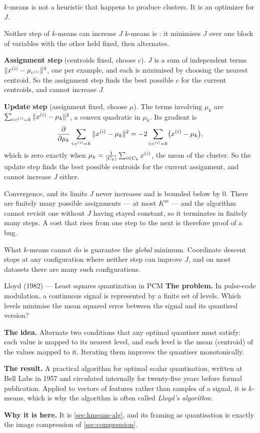 $k$-means is not a heuristic that happens to produce clusters. It is an
optimizer for $J$.

\begin{derivation}{Neither step of $k$-means can increase $J$}
$k$-means is : it minimises $J$ over one block of
variables with the other held fixed, then alternates.

\textbf{Assignment step} (centroids fixed, choose $c$). $J$ is a sum of
independent terms $\|x^{(i)} - \mu_{c^{(i)}}\|^2$, one per example, and each is
minimised by choosing the nearest centroid. So the assignment step finds the
best possible $c$ for the current centroids, and cannot increase $J$.

\textbf{Update step} (assignment fixed, choose $\mu$). The terms involving
$\mu_k$ are $\sum_{i:c^{(i)}=k}\|x^{(i)} - \mu_k\|^2$, a convex quadratic in
$\mu_k$. Its gradient is
\[
  \frac{\partial}{\partial\mu_k}\sum_{i:c^{(i)}=k}\|x^{(i)} - \mu_k\|^2
  = -2\sum_{i:c^{(i)}=k}\bigl(x^{(i)} - \mu_k\bigr),
\]
which is zero exactly when $\mu_k = \frac{1}{|C_k|}\sum_{i\in C_k}x^{(i)}$, the
mean of the cluster. So the update step finds the best possible centroids for
the current assignment, and cannot increase $J$ either.
\end{derivation}

\begin{keyinsight}{Convergence, and its limits}
$J$ never increases and is bounded below by $0$. There are finitely many
possible assignments --- at most $K^m$ --- and the algorithm cannot revisit one
without $J$ having stayed constant, so it terminates in finitely many steps. A
cost that rises from one step to the next is therefore proof of a bug.

What $k$-means cannot do is guarantee the \emph{global} minimum. Coordinate
descent stops at any configuration where neither step can improve $J$, and on
most datasets there are many such configurations.
\end{keyinsight}

\begin{researchspotlight}{Lloyd (1982) --- Least squares quantization in PCM}
\textbf{The problem.} In pulse-code modulation, a continuous signal is
represented by a finite set of levels. Which levels minimise the mean squared
error between the signal and its quantised version?

\textbf{The idea.} Alternate two conditions that any optimal quantiser must
satisfy: each value is mapped to its nearest level, and each level is the mean
(centroid) of the values mapped to it. Iterating them improves the quantiser
monotonically.

\textbf{The result.} A practical algorithm for optimal scalar quantisation,
written at Bell Labs in 1957 and circulated internally for twenty-five years
before formal publication. Applied to vectors of features rather than samples of
a signal, it is $k$-means, which is why the algorithm is often called
\emph{Lloyd's algorithm}.

\textbf{Why it is here.} It is \cref{sec:kmeans-alg}, and its framing as
quantisation is exactly the image compression of \cref{sec:compression}.
\parencite{lloyd1982}
\end{researchspotlight}

